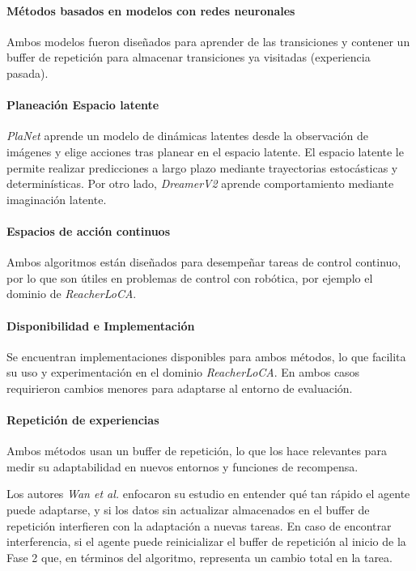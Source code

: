 \paragraph{Métodos basados en modelos con redes neuronales}
Ambos modelos fueron diseñados para aprender de las transiciones y contener un buffer de repetición para almacenar transiciones ya visitadas (experiencia pasada).

\paragraph{Planeación Espacio latente}
\textit{PlaNet} aprende un modelo de dinámicas latentes desde la observación de imágenes y elige acciones tras planear en el espacio latente.
El espacio latente le permite realizar predicciones a largo plazo mediante trayectorias estocásticas y determinísticas.
Por otro lado, \textit{DreamerV2} aprende comportamiento mediante imaginación latente.

\paragraph{Espacios de acción continuos}
Ambos algoritmos están diseñados para desempeñar tareas de control continuo, por lo que son útiles en problemas de control con robótica, por ejemplo el dominio de \textit{ReacherLoCA}.

\paragraph{Disponibilidad e Implementación}
Se encuentran implementaciones disponibles para ambos métodos, lo que facilita su uso y experimentación en el dominio \textit{ReacherLoCA}.
En ambos casos requirieron cambios menores para adaptarse al entorno de evaluación.

\paragraph{Repetición de experiencias}
Ambos métodos usan un buffer de repetición, lo que los hace relevantes para medir su adaptabilidad en nuevos entornos y funciones de recompensa.

Los autores \textit{Wan et al.} enfocaron su estudio en entender qué tan rápido el agente puede adaptarse, y si los datos sin actualizar almacenados en el buffer de repetición interfieren con la adaptación a nuevas tareas.
En caso de encontrar interferencia, si el agente puede reinicializar el buffer de repetición al inicio de la Fase 2 que, en términos del algoritmo, representa un cambio total en la tarea.

